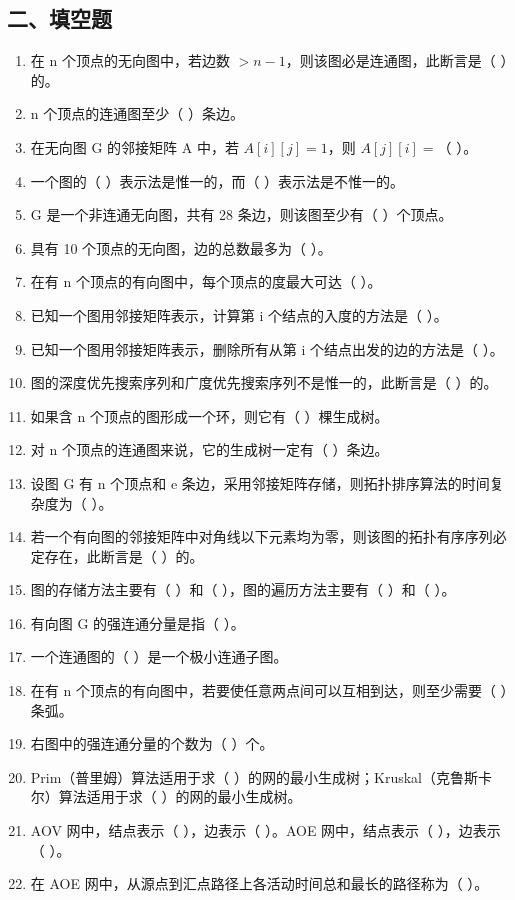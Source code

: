 \documentclass[12pt, a4paper]{article}
\begin{document}
\subsection*{二、填空题}
\begin{enumerate}
    \item 在 n 个顶点的无向图中，若边数 $>n-1$，则该图必是连通图，此断言是（ ）的。
    \item n 个顶点的连通图至少（ ）条边。
    \item 在无向图 G 的邻接矩阵 A 中，若 $A[i][j]=1$，则 $A[j][i]=$（ ）。
    \item 一个图的（ ）表示法是惟一的，而（ ）表示法是不惟一的。
    \item G 是一个非连通无向图，共有 28 条边，则该图至少有（ ）个顶点。
    \item 具有 10 个顶点的无向图，边的总数最多为（ ）。
    \item 在有 n 个顶点的有向图中，每个顶点的度最大可达（ ）。
    \item 已知一个图用邻接矩阵表示，计算第 i 个结点的入度的方法是（ ）。
    \item 已知一个图用邻接矩阵表示，删除所有从第 i 个结点出发的边的方法是（ ）。
    \item 图的深度优先搜索序列和广度优先搜索序列不是惟一的，此断言是（ ）的。
    \item 如果含 n 个顶点的图形成一个环，则它有（ ）棵生成树。
    \item 对 n 个顶点的连通图来说，它的生成树一定有（ ）条边。
    \item 设图 G 有 n 个顶点和 e 条边，采用邻接矩阵存储，则拓扑排序算法的时间复杂度为（ ）。
    \item 若一个有向图的邻接矩阵中对角线以下元素均为零，则该图的拓扑有序序列必定存在，此断言是（ ）的。
    \item 图的存储方法主要有（ ）和（ ），图的遍历方法主要有（ ）和（ ）。
    \item 有向图 G 的强连通分量是指（ ）。
    \item 一个连通图的（ ）是一个极小连通子图。
    \item 在有 n 个顶点的有向图中，若要使任意两点间可以互相到达，则至少需要（ ）条弧。
    \item 右图中的强连通分量的个数为（ ）个。
    \item Prim（普里姆）算法适用于求（ ）的网的最小生成树；Kruskal（克鲁斯卡尔）算法适用于求（ ）的网的最小生成树。
    \item AOV 网中，结点表示（ ），边表示（ ）。AOE 网中，结点表示（ ），边表示（ ）。
    \item 在 AOE 网中，从源点到汇点路径上各活动时间总和最长的路径称为（ ）。
\end{enumerate}
\end{document}

